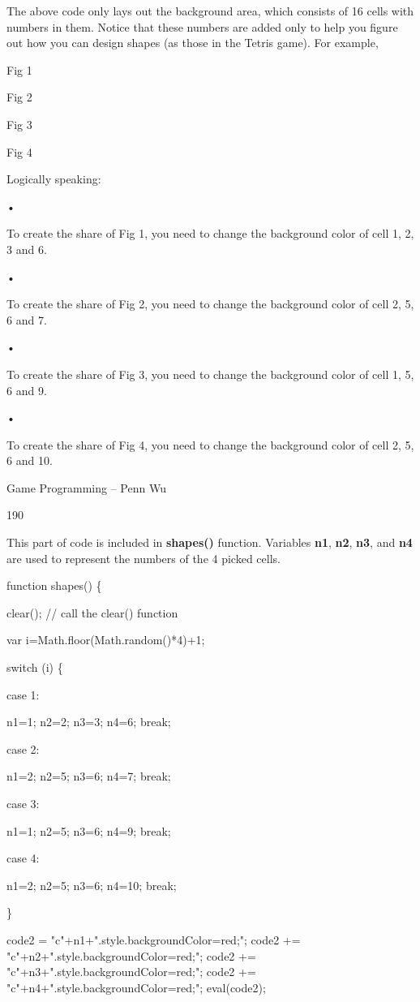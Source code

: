 \documentclass[
]{article}
\begin{document}
The above code only lays out the background area, which consists of 16
cells with numbers in them. Notice that these numbers are added only to
help you figure out how you can design shapes (as those in the Tetris
game). For example,

Fig 1

Fig 2

Fig 3

Fig 4

Logically speaking:

•

To create the share of Fig 1, you need to change the background color of
cell 1, 2, 3 and 6.

•

To create the share of Fig 2, you need to change the background color of
cell 2, 5, 6 and 7.

•

To create the share of Fig 3, you need to change the background color of
cell 1, 5, 6 and 9.

•

To create the share of Fig 4, you need to change the background color of
cell 2, 5, 6 and 10.

Game Programming -- Penn Wu

190

\protect\hypertarget{index_split_011.htmlux5cux23p191}{}{}

This part of code is included in \textbf{shapes()} function. Variables
\textbf{n1}, \textbf{n2}, \textbf{n3}, and \textbf{n4} are used to
represent the numbers of the 4 picked cells.

\textbf{}

function shapes() \{

clear(); // call the clear() function

var i=Math.floor(Math.random()*4)+1;

switch (i) \{

case 1:

n1=1; n2=2; n3=3; n4=6; break;

case 2:

n1=2; n2=5; n3=6; n4=7; break;

case 3:

n1=1; n2=5; n3=6; n4=9; break;

case 4:

n1=2; n2=5; n3=6; n4=10; break;

\}

code2 =
"c"+n1+".style.backgroundColor=\textquotesingle red\textquotesingle;";
code2 +=
"c"+n2+".style.backgroundColor=\textquotesingle red\textquotesingle;";
code2 +=
"c"+n3+".style.backgroundColor=\textquotesingle red\textquotesingle;";
code2 +=
"c"+n4+".style.backgroundColor=\textquotesingle red\textquotesingle;";
eval(code2);
\end{document}
